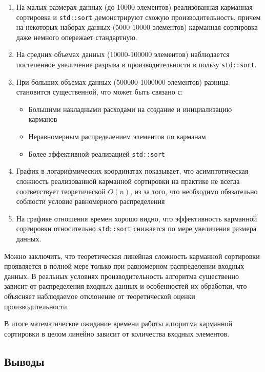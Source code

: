 \documentclass[12pt]{article}
\begin{document}
\begin{enumerate}
    \item На малых размерах данных (до 10000 элементов) реализованная карманная сортировка и \texttt{std::sort} демонстрируют схожую производительность, причем на некоторых наборах данных (5000-10000 элементов) карманная сортировка даже немного опережает стандартную.
    
    \item На средних объемах данных (10000-100000 элементов) наблюдается постепенное увеличение разрыва в производительности в пользу \texttt{std::sort}.
    
    \item При больших объемах данных (500000-1000000 элементов) разница становится существенной, что может быть связано с:
    \begin{itemize}
        \item Большими накладными расходами на создание и инициализацию карманов
        \item Неравномерным распределением элементов по карманам
        \item Более эффективной реализацией \texttt{std::sort}
    \end{itemize}
    
    \item График в логарифмических координатах показывает, что асимптотическая сложность реализованной карманной сортировки на практике не всегда соответствует теоретической $O(n)$, из за того, что необходимо обязательно соблюсти условие равномерного распределения
    
    \item На графике отношения времен хорошо видно, что эффективность карманной сортировки относительно \texttt{std::sort} снижается по мере увеличения размера данных.
\end{enumerate}

Можно заключить, что теоретическая линейная сложность карманной сортировки проявляется в полной мере только при равномерном распределении входных данных. В реальных условиях производительность алгоритма существенно зависит от распределения входных данных и особенностей их обработки, что объясняет наблюдаемое отклонение от теоретической оценки производительности.

 В итоге математическое ожидание времени работы алгоритма карманной сортировки в целом линейно зависит от количества входных элементов.

\newpage
\subsection*{Выводы}
\end{document}
